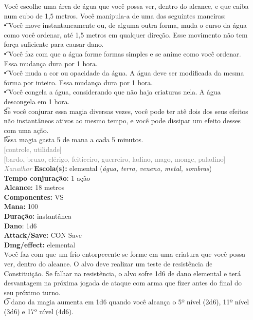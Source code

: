\documentclass{RPG_Adventure}[2021/10/20]
\begin{document}
{\normalsize Você escolhe uma área de água que você possa ver, dentro do alcance, e que caiba num cubo de 1,5 metros. Você manipula-a de uma das seguintes maneiras:\\\t • Você move instantaneamente ou, de alguma outra forma, muda o curso da água como você ordenar, até 1,5 metros em qualquer direção. Esse movimento não tem força suficiente para causar dano.\\\t • Você faz com que a água forme formas simples e se anime como você ordenar. Essa mudança dura por 1 hora.\\\t • Você muda a cor ou opacidade da água. A água deve ser modificada da mesma forma por inteiro. Essa mudança dura por 1 hora.\\\t • Você congela a água, considerando que não haja criaturas nela. A água descongela em 1 hora.\\\t Se você conjurar essa magia diversas vezes, você pode ter atê dois dos seus efeitos não instantâneos ativos ao mesmo tempo, e você pode dissipar um efeito desses com uma ação.\\\t Essa magia gasta 5 de mana a cada 5 minutos.\\}
{\scriptsize \textcolor{gray}{[controle, utilidade]\\}}
{\scriptsize \textcolor{gray}{[bardo, bruxo, clérigo, feiticeiro, guerreiro, ladino, mago, monge, paladino]\\}}
{\tiny \textcolor{gray}{\textit{Xanathar}}}
{\small \t \textbf{Escola(s):} elemental (\textit{água, terra, veneno, metal, sombras})\\\t \textbf{Tempo conjuração:} 1 ação\\\t \textbf{Alcance:} 18 metros\\\t \textbf{Componentes:} VS\\\t \textbf{Mana:} 100\\\t \textbf{Duração:} instantânea\\\t \textbf{Dano}: 1d6\\\t \textbf{Attack/Save:} CON Save\\\t \textbf{Dmg/effect:} elemental\\}
{\normalsize Você faz com que um frio entorpecente se forme em uma criatura que você possa ver, dentro do alcance. O alvo deve realizar um teste de resistência de Constituição. Se falhar na resistência, o alvo sofre 1d6 de dano elemental e terá desvantagem na próxima jogada de ataque com arma que fizer antes do final do seu próximo turno.\\\t O dano da magia aumenta em 1d6 quando você alcança o 5º nível (2d6), 11º nível (3d6) e 17º nível (4d6).\\}
\end{document}
